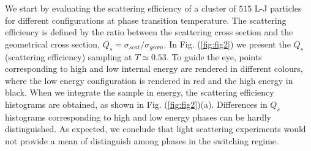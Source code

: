 We start by evaluating the scattering efficiency of a cluster of $515$ L-J particles for different configurations at phase transition temperature. The scattering efficiency is defined by the ratio between the scattering cross section and the geometrical cross section, $Q_{s} = \sigma_{scat}/\sigma_{geom}$.
In Fig. (\ref{fig:fig2}) we present the $Q_s$ (scattering efficiency) sampling at $T \simeq 0.53$. To guide the eye, points corresponding to high and low internal energy are rendered in different colours, where the low energy configuration is rendered in red and the high energy in black. When we integrate the sample in energy, the scattering efficiency histograms are obtained, as shown in Fig.  (\ref{fig:fig2})(a). Differences in $Q_s$ histograms corresponding to high and low energy phases can be hardly distinguished. As expected, we conclude that light scattering experiments would not provide a mean of distinguish among phases in the switching regime.
%

